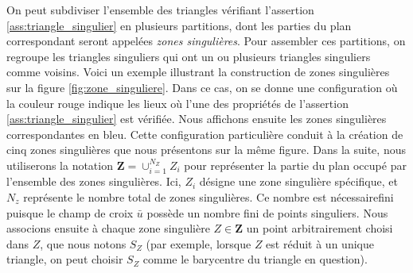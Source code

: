 On peut subdiviser l'ensemble des triangles vérifiant l'assertion \ref{ass:triangle_singulier} en plusieurs partitions, dont les parties du plan correspondant seront appelées \emph{zones singulières}. Pour assembler ces partitions, on regroupe les triangles singuliers qui ont un ou plusieurs triangles singuliers comme voisins. Voici un exemple illustrant la construction de zones singulières sur la figure \ref{fig:zone_singuliere}. Dans ce cas, on se donne une configuration où la couleur rouge indique les lieux où l'une des propriétés de l'assertion \ref{ass:triangle_singulier} est vérifiée. Nous affichons ensuite les zones singulières correspondantes en bleu. Cette configuration particulière conduit à la création de cinq zones singulières que nous présentons sur la même figure. Dans la suite, nous utiliserons la notation $\mathbf{Z}=\cup_{i=1}^{N_Z}Z_i$ pour représenter la partie du plan occupé par l'ensemble des zones singulières. Ici, $Z_i$ désigne une zone singulière spécifique, et $N_z$ représente le nombre total de zones singulières. Ce nombre est nécessairefini puisque le champ de croix $\bar{u}$ possède un nombre fini de points singuliers. Nous associons ensuite à chaque zone singulière $Z\in \mathbf{Z}$ un point arbitrairement choisi dans $Z$, que nous notons $S_Z$ (par exemple, lorsque $Z$ est réduit à un unique triangle, on peut choisir $S_Z$ comme le barycentre du triangle en question).

